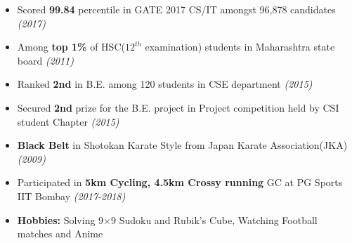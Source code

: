 \documentclass[a4paper,10pt]{article}
\newcommand{\isep}{-2 pt}
\begin{document}
\begin{itemize}\itemsep \isep
    \item \noindent Scored \textbf{99.84} percentile in GATE 2017 CS/IT amongst 96,878 candidates \emph{\hfill  (2017)}
    \item Among \textbf{top 1\%} of HSC($12^{th}$ examination) students in Maharashtra state board \emph{\hfill  (2011)}
    \item Ranked \textbf{2nd} in B.E. among 120 students in CSE department \emph{\hfill  (2015)}
    \item Secured \textbf{2nd} prize for the B.E. project in Project competition held by CSI student Chapter
    \emph{\hfill  (2015)}
    \item \textbf{Black Belt} in Shotokan Karate Style from Japan Karate Association(JKA) \emph{\hfill  (2009)}
    \item Participated in \textbf{5km Cycling, 4.5km Crossy running} GC at PG Sports IIT Bombay \emph{\hfill  (2017-2018)}
    \item \textbf{Hobbies:} Solving 9$\times$9 Sudoku and Rubik's Cube, Watching Football matches and Anime
\end{itemize}
\end{document}
